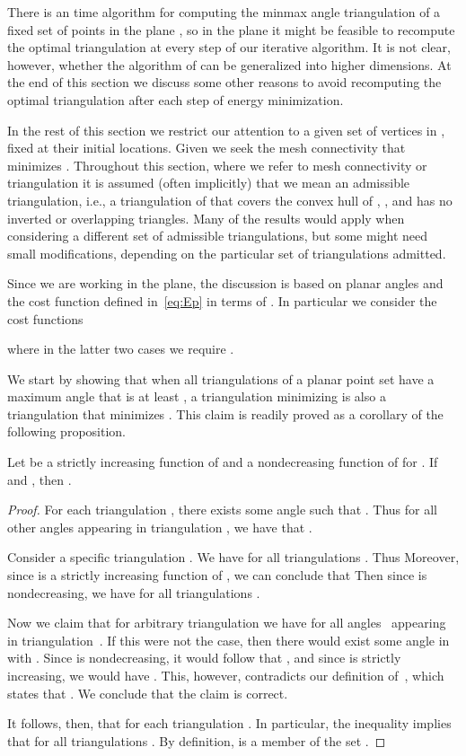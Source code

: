 \documentclass[final]{siamltex}
\begin{document}
There is an  time algorithm for computing the minmax
angle triangulation of a fixed set of points in the plane
\cite{EdTaWa1992}, so in the plane it might be feasible to
recompute the optimal triangulation at every step of our iterative
algorithm.  It is not clear, however, whether the algorithm of
\cite{EdTaWa1992} can be generalized into higher dimensions.
At the end of this section we discuss some other reasons to avoid
recomputing the optimal triangulation after each step of
energy minimization.

In the rest of this section we restrict our attention to a given set
of vertices  in , fixed at their initial locations.
Given  we seek the mesh connectivity  that minimizes
. Throughout this section, where we refer
to mesh connectivity or triangulation it is assumed (often implicitly)
that we mean an admissible triangulation, i.e., a triangulation of
 that covers the convex hull of , , and
has no inverted or overlapping triangles.  Many of the results would
apply when considering a different set of admissible triangulations,
but some might need small modifications, depending on the particular
set of triangulations admitted.

Since we are working in the plane, the discussion is based on planar
angles  and the cost function defined in~\eqref{eq:Ep} in
terms of .  In particular we consider the cost functions

where in the latter two cases we require .


We start by showing that when all triangulations of a planar point set
have a maximum angle that is at least , a triangulation
minimizing  is also a triangulation that minimizes .
This claim is readily proved as a corollary of the following
proposition.

\bigskip

\begin{proposition}
  \label{prop:trngfns} Let  be a strictly increasing function of 
  and  a nondecreasing function of  for .  If  and , then .
\end{proposition}

\begin{proof}
  For each triangulation , there exists some angle
   such that .  Thus for all other angles  appearing
  in triangulation , we have that .

  Consider a specific triangulation .  We
  have  for all triangulations
  .  Thus 
  Moreover, since  is a strictly increasing function of ,
  we can conclude that  Then
  since  is nondecreasing, we have  for all triangulations .

  Now we claim that for arbitrary triangulation  we have
   for all angles~ appearing
  in triangulation~.  If this were not the case, then there
  would exist some angle  in  with .  Since  is nondecreasing, it would follow
  that , and since  is strictly
  increasing, we would have .
  This, however, contradicts our definition of~, which
  states that .  We conclude that the claim is correct.

  It follows, then, that  for each triangulation .  In particular, the
  inequality  implies
  that  for all triangulations
  .  By definition,  is a member of the set
  .
\end{proof}
\end{document}
